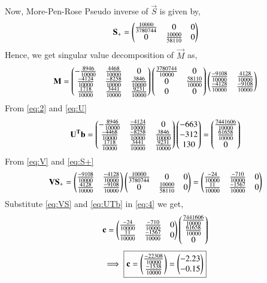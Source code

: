 \begin{enumerate}
Now, More-Pen-Rose Pseudo inverse of $\vec{S}$ is given by,
\begin{align}
	 \mathbf{S_+} = \begin{pmatrix}\frac{10000}{3780744} & 0 & 0 \\ 0 & \frac{10000}{58110} & 0 \end{pmatrix} \label{eq:S+}
\end{align} 
Hence, we get singular value decomposition of $\vec{M}$ as,
\begin{align}
	 \mathbf{M} =\begin{pmatrix}-\frac{8946}{10000} & \frac{4468}{10000} & 0 \\ \frac{-4124}{10000} & \frac{-8258}{10000} & \frac{3846}{10000} \\ \frac{1718}{10000} & \frac{3441}{10000} & \frac{9231}{10000} \end{pmatrix}\begin{pmatrix}\frac{3780744}{10000} & 0 \\ 0 & \frac{58110}{10000}  \\ 0 & 0 \end{pmatrix}\begin{pmatrix}\frac{-9108}{10000} & \frac{4128}{10000} \\ \frac{-4128}{10000} & \frac{-9108}{10000} \end{pmatrix}
\end{align}
From \eqref{eq:2} and \eqref{eq:U}
\begin{align}
	 \mathbf{U^Tb} = \begin{pmatrix}-\frac{8946}{10000} & \frac{-4124}{10000} & 0 \\ \frac{-4468}{10000} & \frac{-8258}{10000} & \frac{3846}{10000} \\ \frac{1718}{10000} & \frac{3441}{10000} & \frac{9231}{10000} \end{pmatrix}\begin{pmatrix}-663 \\ -312 \\ 130\end{pmatrix} = \begin{pmatrix}\frac{7441606}{10000}\\ \frac{61658}{10000}\\ 0\end{pmatrix} \label{eq:UTb}
\end{align}
From \eqref{eq:V} and \eqref{eq:S+}
\begin{align}
	 \mathbf{VS_+} = \begin{pmatrix}\frac{-9108}{10000} & \frac{-4128}{10000} \\ \frac{4128}{10000} & \frac{-9108}{10000} \end{pmatrix}\begin{pmatrix}\frac{10000}{3780744} & 0 & 0 \\ 0 & \frac{10000}{58110} & 0 \end{pmatrix} = \begin{pmatrix}\frac{-24}{10000} & \frac{-710}{10000} & 0 \\ \frac{11}{10000} & \frac{-1567}{10000} & 0 \end{pmatrix}\label{eq:VS}
\end{align}
Substitute \eqref{eq:VS} and \eqref{eq:UTb} in \eqref{eq:4} we get,
\begin{align}
	 \mathbf{c} = \begin{pmatrix}\frac{-24}{10000} & \frac{-710}{10000} & 0 \\ \frac{11}{10000} & \frac{-1567}{10000} & 0 \end{pmatrix}\begin{pmatrix}\frac{7441606}{10000}\\ \frac{61658}{10000}\\ 0\end{pmatrix} 
\end{align}
\begin{align}
	\implies \boxed{\mathbf{c} = \begin{pmatrix}\frac{-22308}{10000}\\ \frac{-1538}{10000}\end{pmatrix} =\begin{pmatrix}-2.23 \\ -0.15\end{pmatrix} }
\end{align} 

\end{enumerate}
